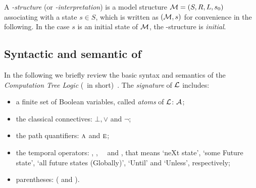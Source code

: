 \documentclass{article}
\begin{document}
A {\em \MPK-structure} (or {\em \MPK-interpretation}) is a model structure
${\cal M}=(S, R, L, s_0)$ associating
with a state $s\in S$, which is written as $({\cal M},s)$ for convenience in the following.
In the case $s$ is an initial state of $\cal M$, the \MPK-structure is {\em initial}.


\subsection{Syntactic and semantic of \CTL}
In the following we briefly review the basic syntax and semantics
of the {\em Computation Tree Logic}
(\CTL\ in short)~\cite{DBLP:journals/toplas/ClarkeES86}. %
%
The {\em signature} of $\cal L$ includes:
\begin{itemize}
  \item a finite set of Boolean variables, called {\em atoms} of $\cal L$: $\cal A$;
  \item the classical connectives: $\bot,\lor$ and $\neg$;
  \item the path quantifiers: $\textsc{a}$ and $\textsc{e}$;
  \item the temporal operators: \NEXT, \FUTURE, \GLOBAL\, \UNTIL\ and \UNLESS, that
  means `neXt state', `some Future state', `all future states (Globally)', `Until' and `Unless', respectively;
  \item parentheses: ( and ).
\end{itemize}
\end{document}
